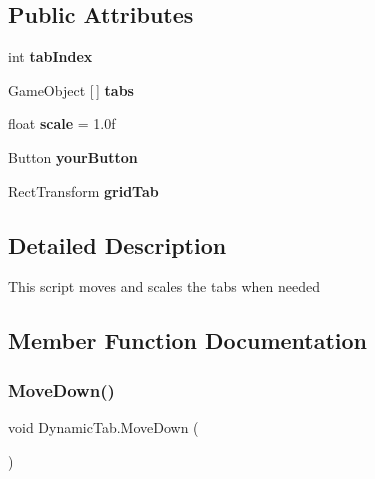 \subsection*{Public Attributes}
\begin{DoxyCompactItemize}
\item 
\mbox{\label{class_dynamic_tab_a3310820127321a8259f84b78ac0b663d}} 
int {\bfseries tab\+Index}
\item 
\mbox{\label{class_dynamic_tab_a52b9c75b4b0d66f44f8e87d9bb3198a2}} 
Game\+Object \mbox{[}$\,$\mbox{]} {\bfseries tabs}
\item 
\mbox{\label{class_dynamic_tab_a8cba12f6445bab7de712f1f5b9a8a468}} 
float {\bfseries scale} = 1.\+0f
\item 
\mbox{\label{class_dynamic_tab_a5696016eddfb72ac561885e07a3280a9}} 
Button {\bfseries your\+Button}
\item 
\mbox{\label{class_dynamic_tab_ab198a7ba270fd8dfa47c2d1b09bf6ed7}} 
Rect\+Transform {\bfseries grid\+Tab}
\end{DoxyCompactItemize}


\subsection{Detailed Description}
This script moves and scales the tabs when needed 



\subsection{Member Function Documentation}
\mbox{\label{class_dynamic_tab_a95fcdcd13d54ad12dfcd46375fd85647}} 
\subsubsection{\texorpdfstring{Move\+Down()}{MoveDown()}}
{\footnotesize\ttfamily void Dynamic\+Tab.\+Move\+Down (\begin{DoxyParamCaption}{ }\end{DoxyParamCaption})}



